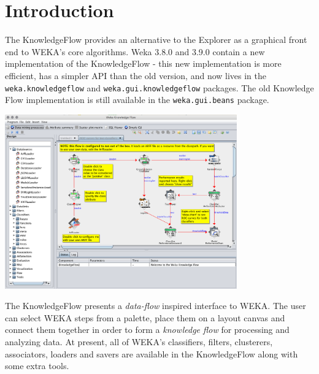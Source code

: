 %
%
%
%



\section{Introduction}

The KnowledgeFlow provides an alternative to the Explorer as a
graphical front end to WEKA's core algorithms. Weka 3.8.0 and 3.9.0
contain a new implementation of the KnowledgeFlow - this new
implementation is more efficient, has a simpler API than the old
version, and now lives in the \verb+weka.knowledgeflow+ and
\verb+weka.gui.knowledgeflow+ packages. The old Knowledge Flow
implementation is still available in the \verb+weka.gui.beans+
package.

\begin{center}
  \includegraphics[width=10cm]{images/knowledgeflow/knowledgeflow.eps}
\end{center}

The KnowledgeFlow presents a \textit{data-flow} inspired interface to
WEKA. The user can select WEKA steps from a palette, place them
on a layout canvas and connect them together in order to form a
\textit{knowledge flow} for processing and analyzing data. At present,
all of WEKA's classifiers, filters, clusterers, associators, loaders
and savers are available in the KnowledgeFlow along with some extra
tools.

